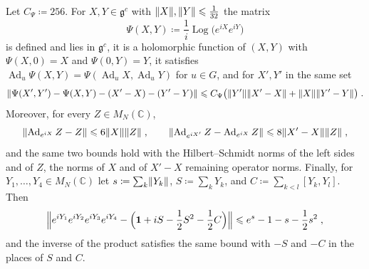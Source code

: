 \documentclass[11pt]{preprint}
\newcommand{\id}{\mathbf 1}
\newcommand{\Ad}{\operatorname{Ad}}
\DeclarePairedDelimiter{\norm}{\lVert}{\rVert}
\numberwithin{equation}{section}
\begin{document}
\begin{lemma}\label{lem:product}
Let $C_\Psi \coloneqq 256$. For $X, Y \in \mathfrak g^c$ with $\norm X, \norm Y \leqslant \frac{1}{32}$ the matrix
\begin{equation}\label{eq:product}
    \Psi(X, Y) \coloneqq \frac{1}{i}\operatorname{Log}\bigl(e^{iX}e^{iY}\bigr)
\end{equation}
is defined and lies in $\mathfrak g^c$, it is a holomorphic function of $(X, Y)$ with $\Psi(X, 0) = X$ and $\Psi(0, Y) = Y$, it satisfies $\Ad_u\Psi(X, Y) = \Psi(\Ad_uX, \Ad_uY)$ for $u \in G$, and for $X', Y'$ in the same set
\begin{equation}\label{eq:product-lipschitz}
    \norm{\Psi(X', Y') - \Psi(X, Y) - (X' - X) - (Y' - Y)} \leqslant C_\Psi\bigl(\norm{Y'}\norm{X' - X} + \norm X\norm{Y' - Y}\bigr)\;.
\end{equation}
Moreover, for every $Z \in M_N(\mathbb C)$,
\begin{equation}\label{eq:adjoint-lipschitz}
    \norm{\Ad_{e^{iX}}Z - Z} \leqslant 6\norm X\norm Z\;,
    \qquad
    \norm{\Ad_{e^{iX'}}Z - \Ad_{e^{iX}}Z} \leqslant 8\norm{X' - X}\norm Z\;,
\end{equation}
and the same two bounds hold with the Hilbert--Schmidt norms of the left sides and of $Z$, the norms of $X$ and of $X' - X$ remaining operator norms. Finally, for $Y_1, \dots, Y_4 \in M_N(\mathbb C)$ let $s \coloneqq \sum_k\norm{Y_k}$, $S \coloneqq \sum_kY_k$, and $C \coloneqq \sum_{k < l}[Y_k, Y_l]$. Then
\begin{equation}\label{eq:four-exponentials}
    \Bigl\lVert e^{iY_1}e^{iY_2}e^{iY_3}e^{iY_4} - \Bigl(\id + iS - \frac{1}{2}S^2 - \frac{1}{2}C\Bigr)\Bigr\rVert \leqslant e^s - 1 - s - \frac{1}{2}s^2\;,
\end{equation}
and the inverse of the product satisfies the same bound with $-S$ and $-C$ in the places of $S$ and $C$.
\end{lemma}
\end{document}
